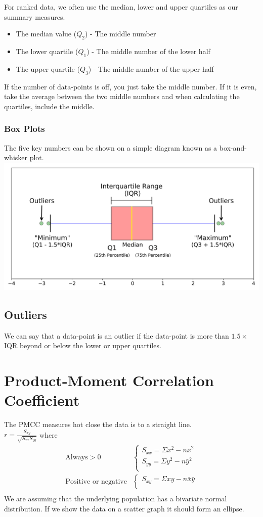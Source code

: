 \documentclass[a4paper,12pt]{article}
\begin{document}
For ranked data, we often use the median, lower and upper quartiles as our summary measures. 
\begin{itemize}
	\item The median value ($Q_2$) - The middle number 
	\item The lower quartile ($Q_1$) - The middle number of the lower half
	\item The upper quartile ($Q_3$) - The middle number of the upper half
\end{itemize}
If the number of data-points is off, you just take the middle number. If it is even, take the average between the two middle numbers and when calculating the quartiles, include the middle.

\subsubsection*{Box Plots} 
The five key numbers can be shown on a simple diagram known as a box-and-whisker plot.\\
\includegraphics[scale=0.07]{BoxPlot}\\

\subsection*{Outliers}
We can say that a data-point is an outlier if the data-point is more than $1.5 \times$ IQR beyond or below the lower or upper quartiles. 
\section*{Product-Moment Correlation Coefficient}
The PMCC measures hot close the data is to a straight line. \\
$r = \frac{S_{xy}}{\sqrt{S_{xx}S_{yy}}}$ where
\begin{align*}
\text{Always} > 0 & \begin{cases}
S_{xx} = \Sigma x^2 - n \bar{x}^2 \\
S_{yy} = \Sigma y^2 - n \bar{y}^2 \\
\end{cases} \\
\text{Positive or negative} & \begin{cases}
S_{xy} = \Sigma xy - n \bar{x} \bar{y} \\
\end{cases} \\
\end{align*}
We are assuming that the underlying population has a bivariate normal distribution. If we show the data on a scatter graph it should form an ellipse. 
\end{document}

